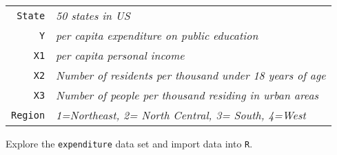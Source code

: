 \documentclass[12pt,letterpaper]{article}
\begin{document}
	
	\begin{tabular}{r|l}
		\texttt{State} &\emph{50 states in US} \\
		\texttt{Y} & \emph{per capita expenditure on public education}\\
		\texttt{X1} &\emph{per capita personal income} \\
		\texttt{X2} &  \emph{Number of residents per thousand under 18 years of age}\\
		\texttt{X3} &  \emph{Number of people per thousand residing in urban areas} \\
		\texttt{Region} &  \emph{1=Northeast, 2= North Central, 3= South, 4=West} \\
	\end{tabular}
	
	\vspace{.5cm}
	\noindent Explore the \texttt{expenditure} data set and import data into \texttt{R}.
	\vspace{.5cm}
	  
	\vspace{.5cm}
\end{document}
